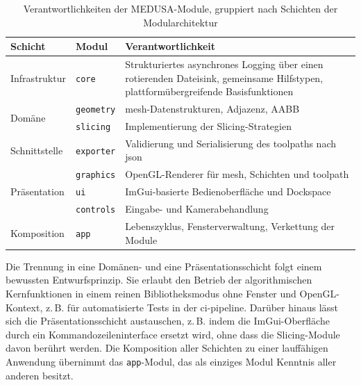                 \begin{table}[ht]
                    \centering
                    \caption[Verantwortlichkeiten der MEDUSA-Module]{Verantwortlichkeiten der MEDUSA-Module, gruppiert nach Schichten der Modularchitektur}
                    \label{tab:concept-medusa-modules}
                    \begin{tabular}{@{} l l p{6.5cm} @{}}
                        \toprule
                        \textbf{Schicht} & \textbf{Modul} & \textbf{Verantwortlichkeit} \\
                        \midrule
                        Infrastruktur & \texttt{core}     & Strukturiertes asynchrones Logging über einen rotierenden Dateisink, gemeinsame Hilfstypen, plattformübergreifende Basisfunktionen \\
                        \midrule
                        \multirow{2}{*}{Domäne}
                                    & \texttt{geometry} & \gls{mesh}-Datenstrukturen, Adjazenz, \ac{AABB} \\
                                    & \texttt{slicing}  & Implementierung der Slicing-Strategien \\
                        \midrule
                        Schnittstelle & \texttt{exporter} & Validierung und Serialisierung des \glspl{toolpath} nach \gls{json} \\
                        \midrule
                        \multirow{3}{*}{Präsentation}
                                    & \texttt{graphics} & OpenGL-Renderer für \gls{mesh}, Schichten und \gls{toolpath} \\
                                    & \texttt{ui}       & ImGui-basierte Bedienoberfläche und Dockspace \\
                                    & \texttt{controls} & Eingabe- und Kamerabehandlung \\
                        \midrule
                        Komposition   & \texttt{app}      & Lebenszyklus, Fensterverwaltung, Verkettung der Module \\
                        \bottomrule
                    \end{tabular}
                \end{table}

                Die Trennung in eine Domänen- und eine Präsentationsschicht folgt einem bewussten Entwurfsprinzip.
                Sie erlaubt den Betrieb der algorithmischen Kernfunktionen in einem reinen Bibliotheksmodus ohne Fenster und OpenGL-Kontext, z.\,B. für automatisierte Tests in der \gls{ci-pipeline}.
                Darüber hinaus lässt sich die Präsentationsschicht austauschen, z.\,B. indem die ImGui-Oberfläche durch ein Kommandozeileninterface ersetzt wird, ohne dass die Slicing-Module davon berührt werden.
                Die Komposition aller Schichten zu einer lauffähigen Anwendung übernimmt das \texttt{app}-Modul, das als einziges Modul Kenntnis aller anderen besitzt.


